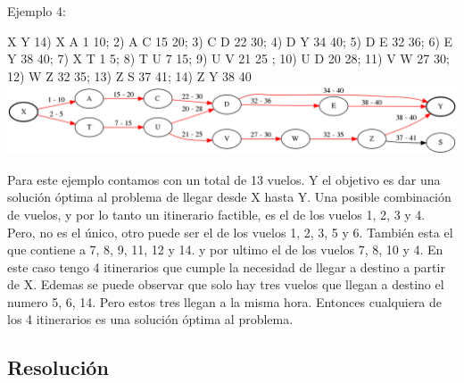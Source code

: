\documentclass[a4paper]{article}
\begin{document}
Ejemplo 4:

X Y 14) X A 1 10;  2) A C 15 20;  3) C D 22 30;  4) D Y 34 40;  5) D E 32 36;  6) E Y 38 40;  7) X T 1 5;
8) T U 7 15;  9) U V 21 25 ;  10) U D 20 28;  11) V W 27 30;  12) W Z 32 35;  13)  Z S 37 41;
14) Z Y 38 40  
\includegraphics[width=\textwidth,height=\textheight,keepaspectratio
]{ejemplo4.png}\newline

Para este ejemplo contamos con un total de 13 vuelos. Y el objetivo es dar una solución óptima al problema de llegar desde X hasta Y. Una posible combinación de vuelos, y por lo tanto un itinerario factible, es el de los vuelos 1, 2, 3 y 4. Pero, no es el único, otro puede ser el de los vuelos 1,  2, 3, 5 y 6. También esta el que contiene a  7, 8, 9, 11, 12 y 14. y por ultimo el de los vuelos 7, 8, 10 y 4. En este caso tengo 4 itinerarios que cumple la necesidad de llegar a destino a partir de X. Edemas se puede observar que solo hay tres vuelos que llegan a destino el numero 5, 6, 14. Pero estos tres llegan a la misma hora. Entonces cualquiera de los 4 itinerarios es una solución óptima al problema.\newline \newline




\subsection{Resolución}
\end{document}
